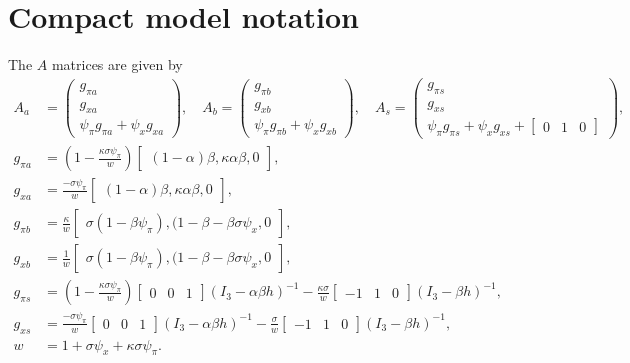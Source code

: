 \documentclass[11pt]{article}
\renewcommand{\[}{\begin{equation}}
\renewcommand{\]}{\end{equation}}
\begin{document}
\section{Compact model notation}\label{app_compact} 
The $A$ matrices are given by
\begin{align}
A_a & = \begin{pmatrix} g_{\pi a} \\ g_{x a} \\ \psi_{\pi}g_{\pi a} + \psi_xg_{x a}
\end{pmatrix},
\quad A_b = \begin{pmatrix} g_{\pi b} \\ g_{x b} \\ \psi_{\pi}g_{\pi b} + \psi_xg_{x b}
\end{pmatrix},
 \quad A_s = \begin{pmatrix} g_{\pi s} \\ g_{x s} \\ \psi_{\pi}g_{\pi s} + \psi_xg_{x s} + \begin{bmatrix} 0 & 1& 0\end{bmatrix}
\end{pmatrix}, \\
g_{\pi a} & =(1-\frac{\kappa\sigma\psi_{\pi}}{w} )  \begin{bmatrix}(1-\alpha)\beta, \kappa\alpha\beta, 0 \end{bmatrix}, \\
g_{x a} & =  \frac{-\sigma\psi_{\pi}}{w} \begin{bmatrix}(1-\alpha)\beta, \kappa\alpha\beta, 0 \end{bmatrix},\\
g_{\pi b} & = \frac{\kappa}{w} \begin{bmatrix}\sigma(1-\beta\psi_{\pi}), (1-\beta-\beta\sigma\psi_x, 0 \end{bmatrix},\\
g_{x b} & = \frac{1}{w} \begin{bmatrix}\sigma(1-\beta\psi_{\pi}), (1-\beta-\beta\sigma\psi_x, 0 \end{bmatrix}, \\
g_{\pi s} & = (1-\frac{\kappa\sigma\psi_{\pi}}{w} )\begin{bmatrix} 0&0&1 \end{bmatrix} (I_3 - \alpha\beta h)^{-1} -\frac{\kappa\sigma}{w}\begin{bmatrix} -1&1&0 \end{bmatrix} (I_3 -\beta h)^{-1},\\
g_{x s} & =  \frac{-\sigma\psi_{\pi}}{w} \begin{bmatrix} 0&0&1 \end{bmatrix}(I_3 - \alpha\beta h)^{-1}  -\frac{\sigma}{w}\begin{bmatrix} -1&1&0 \end{bmatrix}(I_3 -\beta h)^{-1},\\
w & = 1+\sigma\psi_x +\kappa\sigma\psi_{\pi}.
\end{align}
\end{document}
